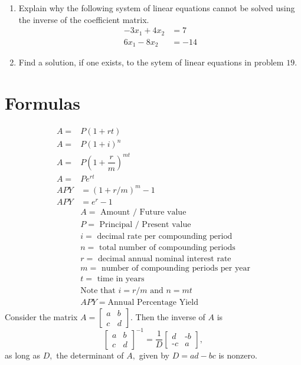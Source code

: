 \documentclass[11pt]{article} %
\begin{document}
\begin{enumerate}
\item Explain why the following system of linear equations cannot be solved using the inverse of the coefficient matrix. 
\begin{align*}
-3x_1 + 4x_2 &= 7 \\
6x_1 - 8x_2 &= -14
\end{align*}
\item Find a solution, if one exists, to the sytem of linear equations in problem $19.$
\end{enumerate}
\section*{Formulas}
\begin{align*}
A = &P(1+rt)  \\
	A = &P(1+i)^n  \\
	A = &P\left(1+\dfrac{r}{m}\right)^{mt}  \\
	A = &Pe^{rt} \\
	APY &= (1+r/m)^m -1 \\
	APY &= e^r -1 \\
	&A = \text{ Amount / Future value} \\
	&P = \text{ Principal / Present value} \\
	&i = \text{ decimal rate per compounding period} \\
	&n = \text{ total number of compounding periods} \\
	&r = \text{ decimal annual nominal interest rate} \\
	&m = \text{ number of compounding periods per year} \\
	&t = \text{ time in years} \\
	&\text{Note that } i=r/m \text{ and } n= mt \\
	&APY = \text{Annual Percentage Yield}
\end{align*}
Consider the matrix $A = \begin{bmatrix} a & b \\ c & d \end{bmatrix}.$ Then the inverse of $A$ is 
$$\begin{bmatrix} a & b \\ c & d \end{bmatrix}^{-1} = \dfrac{1}{D}\begin{bmatrix} d & \text{-}b \\ \text{-}c & a \end{bmatrix},$$ as long as $D,$ the determinant of $A,$ given by $D = ad-bc$ is nonzero.
\end{document}

